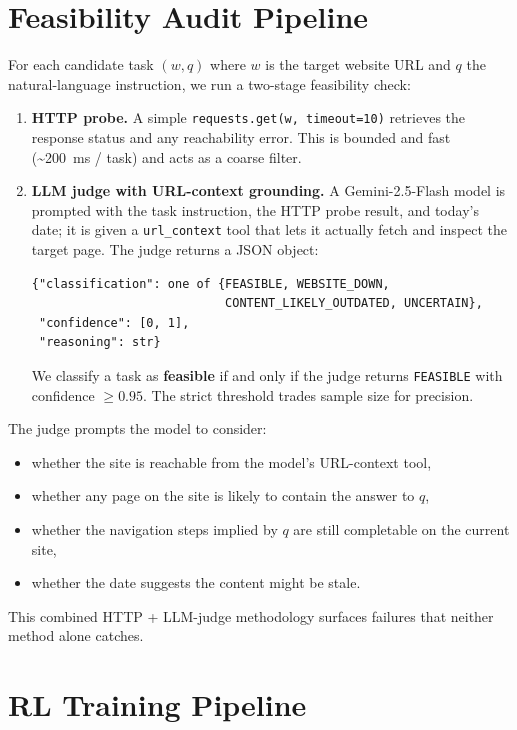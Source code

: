 \documentclass[12pt,a4paper]{report}
\begin{document}
\section{Feasibility Audit Pipeline}\label{sec:feasibility-pipeline}

For each candidate task $(w, q)$ where $w$ is the target website URL and $q$ the natural-language instruction, we run a two-stage feasibility check:

\begin{enumerate}
  \item \textbf{HTTP probe.} A simple \texttt{requests.get(w, timeout=10)} retrieves the response status and any reachability error. This is bounded and fast (\textasciitilde 200~ms / task) and acts as a coarse filter.
  \item \textbf{LLM judge with URL-context grounding.} A Gemini-2.5-Flash model is prompted with the task instruction, the HTTP probe result, and today's date; it is given a \texttt{url\_context} tool that lets it actually fetch and inspect the target page. The judge returns a JSON object:
  \begin{lstlisting}
{"classification": one of {FEASIBLE, WEBSITE_DOWN,
                           CONTENT_LIKELY_OUTDATED, UNCERTAIN},
 "confidence": [0, 1],
 "reasoning": str}
  \end{lstlisting}
  We classify a task as \textbf{feasible} if and only if the judge returns \texttt{FEASIBLE} with confidence $\geq 0.95$. The strict threshold trades sample size for precision.
\end{enumerate}

The judge prompts the model to consider:
\begin{itemize}
  \item whether the site is reachable from the model's URL-context tool,
  \item whether any page on the site is likely to contain the answer to $q$,
  \item whether the navigation steps implied by $q$ are still completable on the current site,
  \item whether the date suggests the content might be stale.
\end{itemize}

This combined HTTP + LLM-judge methodology surfaces failures that neither method alone catches.

\section{RL Training Pipeline}\label{sec:rl-training}
\end{document}

